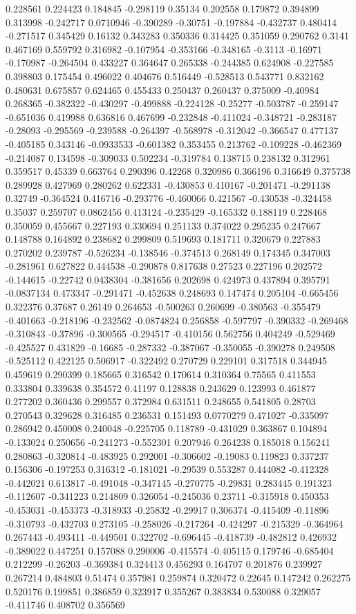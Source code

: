 0.228561 0.224423 0.184845 -0.298119 0.35134 0.202558 0.179872 0.394899 0.313998 -0.242717 0.0710946 -0.390289 -0.30751 -0.197884 -0.432737 0.480414 -0.271517 0.345429 0.16132 0.343283 0.350336 0.314425 0.351059 0.290762 0.3141 0.467169 0.559792 0.316982 -0.107954 -0.353166 -0.348165 -0.3113 -0.16971 -0.170987 -0.264504 0.433227 0.364647 0.265338 -0.244385 0.624908 -0.227585 0.398803 0.175454 0.496022 0.404676 0.516449 -0.528513 0.543771 0.832162 0.480631 0.675857 0.624465 0.455433 0.250437 0.260437 0.375009 -0.40984 0.268365 -0.382322 -0.430297 -0.499888 -0.224128 -0.25277 -0.503787 -0.259147 -0.651036 0.419988 0.636816 0.467699 -0.232848 -0.411024 -0.348721 -0.283187 -0.28093 -0.295569 -0.239588 -0.264397 -0.568978 -0.312042 -0.366547 0.477137 -0.405185 0.343146 -0.0933533 -0.601382 0.353455 0.213762 -0.109228 -0.462369 -0.214087 0.134598 -0.309033 0.502234 -0.319784 0.138715 0.238132 0.312961 0.359517 0.45339 0.663764 0.290396 0.42268 0.320986 0.366196 0.316649 0.375738 0.289928 0.427969 0.280262 0.622331 -0.430853 0.410167 -0.201471 -0.291138 0.32749 -0.364524 0.416716 -0.293776 -0.460066 0.421567 -0.430538 -0.324458 0.35037 0.259707 0.0862456 0.413124 -0.235429 -0.165332 0.188119 0.228468 0.350059 0.455667 0.227193 0.330694 0.251133 0.374022 0.295235 0.247667 0.148788 0.164892 0.238682 0.299809 0.519693 0.181711 0.320679 0.227883 0.270202 0.239787 -0.526234 -0.138546 -0.374513 0.268149 0.174345 0.347003 -0.281961 0.627822 0.444538 -0.290878 0.817638 0.27523 0.227196 0.202572 -0.144615 -0.22742 0.0438304 -0.381656 0.202698 0.424973 0.437894 0.395791 -0.0837134 0.473347 -0.291471 -0.452638 0.248693 0.147474 0.205104 -0.665456 0.322376 0.37687 0.26149 0.264653 -0.500263 0.260699 -0.380563 -0.355479 -0.401663 -0.218196 -0.232562 -0.0874824 0.256858 -0.597797 -0.390332 -0.269468 -0.310843 -0.37896 -0.300565 -0.294517 -0.410156 0.562756 0.404249 -0.529469 -0.425527 0.431829 -0.16685 -0.287332 -0.387067 -0.350055 -0.390278 0.249508 -0.525112 0.422125 0.506917 -0.322492 0.270729 0.229101 0.317518 0.344945 0.459619 0.290399 0.185665 0.316542 0.170614 0.310364 0.75565 0.411553 0.333804 0.339638 0.354572 0.41197 0.128838 0.243629 0.123993 0.461877 0.277202 0.360436 0.299557 0.372984 0.631511 0.248655 0.541805 0.28703 0.270543 0.329628 0.316485 0.236531 0.151493 0.0770279 0.471027 -0.335097 0.286942 0.450008 0.240048 -0.225705 0.118789 -0.431029 0.363867 0.104894 -0.133024 0.250656 -0.241273 -0.552301 0.207946 0.264238 0.185018 0.156241 0.280863 -0.320814 -0.483925 0.292001 -0.306602 -0.19083 0.119823 0.337237 0.156306 -0.197253 0.316312 -0.181021 -0.29539 0.553287 0.444082 -0.412328 -0.442021 0.613817 -0.491048 -0.347145 -0.270775 -0.29831 0.283445 0.191323 -0.112607 -0.341223 0.214809 0.326054 -0.245036 0.23711 -0.315918 0.450353 -0.453031 -0.453373 -0.318933 -0.25832 -0.29917 0.306374 -0.415409 -0.11896 -0.310793 -0.432703 0.273105 -0.258026 -0.217264 -0.424297 -0.215329 -0.364964 0.267443 -0.493411 -0.449501 0.322702 -0.696445 -0.418739 -0.482812 0.426932 -0.389022 0.447251 0.157088 0.290006 -0.415574 -0.405115 0.179746 -0.685404 0.212299 -0.26203 -0.369384 0.324413 0.456293 0.164707 0.201876 0.239927 0.267214 0.484803 0.51474 0.357981 0.259874 0.320472 0.22645 0.147242 0.262275 0.520176 0.199851 0.386859 0.323917 0.355267 0.383834 0.530088 0.329057 -0.411746 0.408702 0.356569 